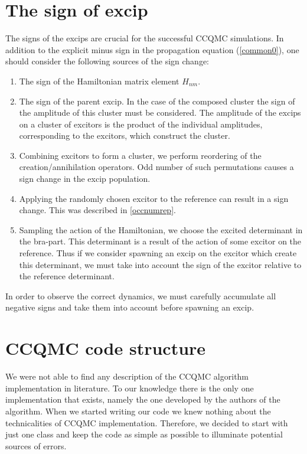 \documentclass[twoside,english]{uiofysmaster}
\begin{document}
\section{The sign of excip}
The signs of the excips are crucial for the successful CCQMC simulations. In addition to the explicit minus sign in the propagation equation (\ref{common0}), one should consider the following sources of the sign change:

\begin{enumerate}
	
	\item The sign of the Hamiltonian matrix element $H_{nm}$.
	
	\item The sign of the parent excip. In the case of the composed cluster the sign of the amplitude of this cluster must be considered. The amplitude of the excips on a cluster of excitors is the product of the individual amplitudes, corresponding to the excitors, which construct the cluster.
	
	\item Combining excitors to form a cluster, we perform reordering of the creation/annihilation operators. Odd number of such permutations causes a sign change in the excip population.
	
	\item Applying the randomly chosen excitor to the reference can result in a sign change. This was described in \autoref{occnumrep}.  
	
	\item Sampling the action of the Hamiltonian, we choose the excited determinant in the bra-part. This determinant is a result of the action of some excitor on the reference. Thus if we consider spawning an excip on the excitor which create this determinant, we must take into account the sign of the excitor relative to the reference determinant.
\end{enumerate}

In order to observe the correct dynamics, we must carefully accumulate all negative signs and take them into account before spawning an excip.


\section{CCQMC code structure}

We were not able to find any description of the CCQMC algorithm
implementation in literature. To our knowledge there is the only one
implementation that exists, namely the one  developed by the authors of the
algorithm. When we started writing our code we knew nothing about the 
technicalities of CCQMC implementation. Therefore, we decided to
start with just one class and keep the code as simple as possible to
illuminate potential sources of errors.
\end{document}
